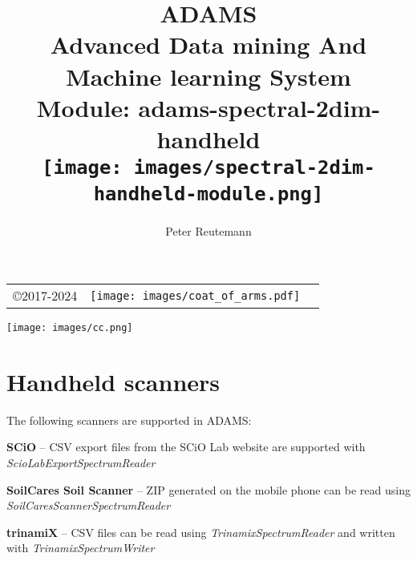 \documentclass[a4paper]{book}
\title{
  \textbf{ADAMS} \\
  {\Large \textbf{A}dvanced \textbf{D}ata mining \textbf{A}nd \textbf{M}achine
  learning \textbf{S}ystem} \\
  {\Large Module: adams-spectral-2dim-handheld} \\
  \vspace{1cm}
  \texttt{[image: images/spectral-2dim-handheld-module.png]} \\
}
\author{
  Peter Reutemann
}
\begin{document}
\begin{titlepage}
\maketitle

\thispagestyle{empty}
\center
\begin{table}[b]
	\begin{tabular}{c l l}
		\parbox[c][2cm]{2cm}{\copyright 2017-2024} &
		\parbox[c][2cm]{5cm}{\texttt{[image: images/coat\_of\_arms.pdf]}} \\
	\end{tabular}
	\texttt{[image: images/cc.png]} \\
\end{table}

\end{titlepage}

\tableofcontents

\chapter{Handheld scanners}
The following scanners are supported in ADAMS:
\begin{tight_itemize}
  \item \textbf{SCiO}\cite{scio} -- CSV export files from the SCiO Lab website
  are supported with \textit{ScioLabExportSpectrumReader}
  \item \textbf{SoilCares Soil Scanner}\cite{soilcaressoil} -- ZIP generated on
  the mobile phone can be read using \textit{SoilCaresScannerSpectrumReader}
  \item \textbf{trinamiX}\cite{trinamix} -- CSV files can be read using
  \textit{TrinamixSpectrumReader} and written with \textit{TrinamixSpectrumWriter}

\end{tight_itemize}



\end{document}
